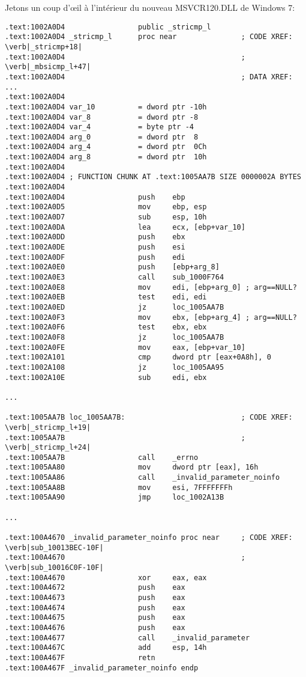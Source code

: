 Jetons un coup d'\oe{}il à l'intérieur du nouveau MSVCR120.DLL de Windows 7:

\begin{lstlisting}[style=customasmx86]
.text:1002A0D4                 public _stricmp_l
.text:1002A0D4 _stricmp_l      proc near               ; CODE XREF: \verb|_stricmp+18|
.text:1002A0D4                                         ; \verb|_mbsicmp_l+47|
.text:1002A0D4                                         ; DATA XREF: ...
.text:1002A0D4
.text:1002A0D4 var_10          = dword ptr -10h
.text:1002A0D4 var_8           = dword ptr -8
.text:1002A0D4 var_4           = byte ptr -4
.text:1002A0D4 arg_0           = dword ptr  8
.text:1002A0D4 arg_4           = dword ptr  0Ch
.text:1002A0D4 arg_8           = dword ptr  10h
.text:1002A0D4
.text:1002A0D4 ; FUNCTION CHUNK AT .text:1005AA7B SIZE 0000002A BYTES
.text:1002A0D4
.text:1002A0D4                 push    ebp
.text:1002A0D5                 mov     ebp, esp
.text:1002A0D7                 sub     esp, 10h
.text:1002A0DA                 lea     ecx, [ebp+var_10]
.text:1002A0DD                 push    ebx
.text:1002A0DE                 push    esi
.text:1002A0DF                 push    edi
.text:1002A0E0                 push    [ebp+arg_8]
.text:1002A0E3                 call    sub_1000F764
.text:1002A0E8                 mov     edi, [ebp+arg_0] ; arg==NULL?
.text:1002A0EB                 test    edi, edi
.text:1002A0ED                 jz      loc_1005AA7B
.text:1002A0F3                 mov     ebx, [ebp+arg_4] ; arg==NULL?
.text:1002A0F6                 test    ebx, ebx
.text:1002A0F8                 jz      loc_1005AA7B
.text:1002A0FE                 mov     eax, [ebp+var_10]
.text:1002A101                 cmp     dword ptr [eax+0A8h], 0
.text:1002A108                 jz      loc_1005AA95
.text:1002A10E                 sub     edi, ebx

...

.text:1005AA7B loc_1005AA7B:                           ; CODE XREF: \verb|_stricmp_l+19|
.text:1005AA7B                                         ; \verb|_stricmp_l+24|
.text:1005AA7B                 call    _errno
.text:1005AA80                 mov     dword ptr [eax], 16h
.text:1005AA86                 call    _invalid_parameter_noinfo
.text:1005AA8B                 mov     esi, 7FFFFFFFh
.text:1005AA90                 jmp     loc_1002A13B

...

.text:100A4670 _invalid_parameter_noinfo proc near     ; CODE XREF: \verb|sub_10013BEC-10F|
.text:100A4670                                         ; \verb|sub_10016C0F-10F|
.text:100A4670                 xor     eax, eax
.text:100A4672                 push    eax
.text:100A4673                 push    eax
.text:100A4674                 push    eax
.text:100A4675                 push    eax
.text:100A4676                 push    eax
.text:100A4677                 call    _invalid_parameter
.text:100A467C                 add     esp, 14h
.text:100A467F                 retn
.text:100A467F _invalid_parameter_noinfo endp


\end{lstlisting}
